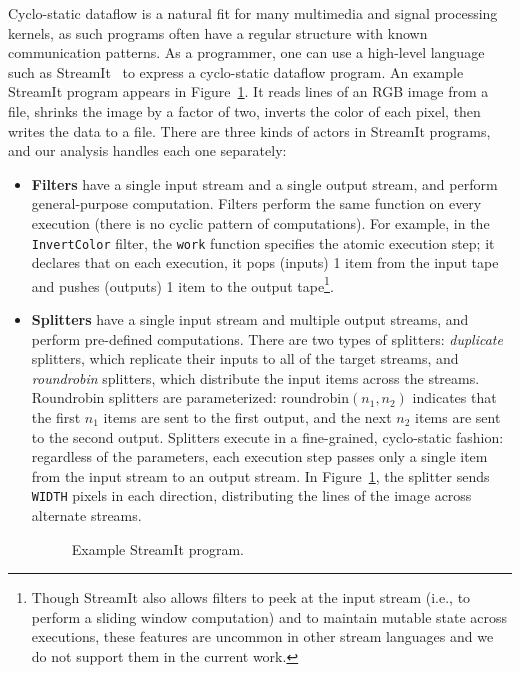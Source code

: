 Cyclo-static dataflow is a natural fit for many multimedia and signal
processing kernels, as such programs often have a regular structure
with known communication patterns.  As a programmer, one can use a
high-level language such as StreamIt~\cite{streamitcc} to express a
cyclo-static dataflow program.  An example StreamIt program appears in
Figure~\ref{fig:streamit}.  It reads lines of an RGB image from a
file, shrinks the image by a factor of two, inverts the color of each
pixel, then writes the data to a file.  There are three kinds of
actors in StreamIt programs, and our analysis handles each one
separately:
\begin{itemize}

\item {\bf Filters} have a single input stream and a single output
  stream, and perform general-purpose computation.  Filters perform
  the same function on every execution (there is no cyclic pattern of
  computations).  For example, in the {\tt InvertColor} filter, the
  {\tt work} function specifies the atomic execution step; it declares
  that on each execution, it pops (inputs) 1 item from the input tape
  and pushes (outputs) 1 item to the output tape\footnote{Though
    StreamIt also allows filters to peek at the input stream (i.e., to
    perform a sliding window computation) and to maintain mutable
    state across executions, these features are uncommon in other
    stream languages and we do not support them in the current work.}.

\item {\bf Splitters} have a single input stream and multiple output
  streams, and perform pre-defined computations.  There are two types
  of splitters: {\it duplicate} splitters, which replicate their
  inputs to all of the target streams, and {\it roundrobin} splitters,
  which distribute the input items across the streams.  Roundrobin
  splitters are parameterized: roundrobin$(n_1, n_2)$ indicates that
  the first $n_1$ items are sent to the first output, and the next
  $n_2$ items are sent to the second output.  Splitters execute in a
  fine-grained, cyclo-static fashion: regardless of the parameters,
  each execution step passes only a single item from the input stream
  to an output stream.  In Figure~\ref{fig:streamit}, the splitter
  sends {\tt WIDTH} pixels in each direction, distributing the lines
  of the image across alternate streams.

\begin{figure}[t]
\caption{Example StreamIt program.
\protect\label{fig:streamit}}
\end{figure}


\end{itemize}

